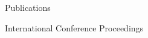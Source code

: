 \begin{rSection}{Publications}


\begin{pubSubsectionNum}{International Conference Proceedings}
  \item {}
\end{pubSubsectionNum}





\end{rSection}
